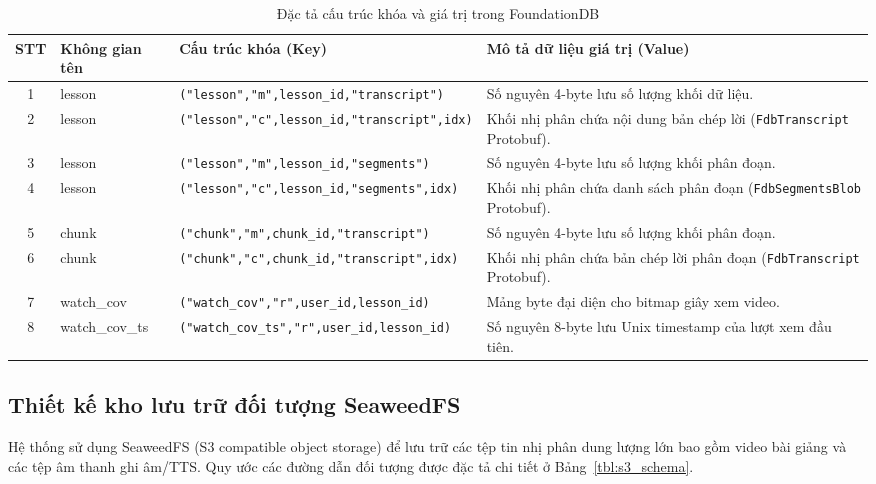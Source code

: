 \documentclass[../DoAn.tex]{subfiles}
\begin{document}
\begin{table}[H]
\centering
\small
\renewcommand{\arraystretch}{1.3}
\begin{tabular}{|c|l|>{\raggedright\arraybackslash}p{4.2cm}|>{\raggedright\arraybackslash}p{5.5cm}|}
\hline
\textbf{STT} & \textbf{Không gian tên} & \textbf{Cấu trúc khóa (Key)} & \textbf{Mô tả dữ liệu giá trị (Value)} \\ \hline
1 & lesson & \texttt{("lesson",\allowbreak "m",\allowbreak lesson\_id,\allowbreak "transcript")} & Số nguyên 4-byte lưu số lượng khối dữ liệu. \\ \hline
2 & lesson & \texttt{("lesson",\allowbreak "c",\allowbreak lesson\_id,\allowbreak "transcript",\allowbreak idx)} & Khối nhị phân chứa nội dung bản chép lời (\texttt{FdbTranscript} Protobuf). \\ \hline
3 & lesson & \texttt{("lesson",\allowbreak "m",\allowbreak lesson\_id,\allowbreak "segments")} & Số nguyên 4-byte lưu số lượng khối phân đoạn. \\ \hline
4 & lesson & \texttt{("lesson",\allowbreak "c",\allowbreak lesson\_id,\allowbreak "segments",\allowbreak idx)} & Khối nhị phân chứa danh sách phân đoạn (\texttt{FdbSegmentsBlob} Protobuf). \\ \hline
5 & chunk & \texttt{("chunk",\allowbreak "m",\allowbreak chunk\_id,\allowbreak "transcript")} & Số nguyên 4-byte lưu số lượng khối phân đoạn. \\ \hline
6 & chunk & \texttt{("chunk",\allowbreak "c",\allowbreak chunk\_id,\allowbreak "transcript",\allowbreak idx)} & Khối nhị phân chứa bản chép lời phân đoạn (\texttt{FdbTranscript} Protobuf). \\ \hline
7 & watch\_cov & \texttt{("watch\_cov",\allowbreak "r",\allowbreak user\_id,\allowbreak lesson\_id)} & Mảng byte đại diện cho bitmap giây xem video. \\ \hline
8 & watch\_cov\_ts & \texttt{("watch\_cov\_ts",\allowbreak "r",\allowbreak user\_id,\allowbreak lesson\_id)} & Số nguyên 8-byte lưu Unix timestamp của lượt xem đầu tiên. \\ \hline
\end{tabular}
\caption{Đặc tả cấu trúc khóa và giá trị trong FoundationDB}
\label{tbl:fdb_schema}
\end{table}

\subsection{Thiết kế kho lưu trữ đối tượng SeaweedFS}
Hệ thống sử dụng SeaweedFS (S3 compatible object storage) để lưu trữ các tệp tin nhị phân dung lượng lớn bao gồm video bài giảng và các tệp âm thanh ghi âm/TTS. Quy ước các đường dẫn đối tượng được đặc tả chi tiết ở Bảng~\ref{tbl:s3_schema}.
\end{document}
